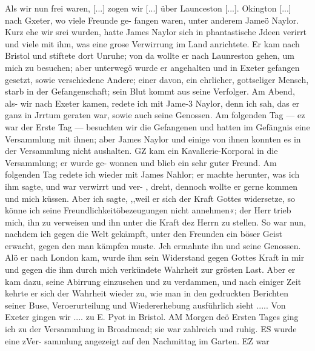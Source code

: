 Als wir nun frei waren, [...] zogen wir [...] über Launceston 
[...]. Okington [...] nach Gxeter, wo viele Freunde ge-
fangen waren, unter anderem Jameö Naylor. Kurz ehe wir
srei wurden, hatte James Naylor sich in phantastische Jdeen
verirrt und viele mit ihm, was eine grose Verwirrung im Land
anrichtete. Er kam nach Bristol und stiftete dort Unruhe; von
da wollte er nach Launreston gehen, um mich zu besuchen; aber
unterwegö wurde er angehalten und in Exeter gefangen gesetzt,
sowie verschiedene Andere; einer davon, ein ehrlicher, gottseliger
Mensch, starb in der Gefangenschaft; sein Blut kommt aus seine
Verfolger.
Am Abend, als- wir nach Exeter kamen, redete ich mit Jame-3
Naylor, denn ich sah, das er ganz in Jrrtum geraten war, sowie
auch seine Genossen. Am folgenden Tag — ez war der Erste
Tag — besuchten wir die Gefangenen und hatten im Gefängnis
eine Versammlung mit ihnen; aber James Naylor und einige
von ihnen konnten es in der Versammlung nicht aushalten. GZ
kam ein Kavallerie-Korporal in die Versammlung; er wurde ge-
wonnen und blieb ein sehr guter Freund.
Am folgenden Tag redete ich wieder mit James Nahlor; er
machte herunter, was ich ihm sagte, und war verwirrt und ver-
, dreht, dennoch wollte er gerne kommen und mich küssen. Aber
ich sagte, ,,weil er sich der Kraft Gottes widersetze, so könne ich
seine Freundlichkeitöbezeugungen nicht annehmen«; der Herr trieb
mich, ihn zu verweisen und ihn unter die Kraft dez Herrn zu
stellen. So war nun, nachdem ich gegen die Welt gekämpft, unter
den Freunden ein böser Geist erwacht, gegen den man kämpfen
muste. Jch ermahnte ihn und seine Genossen. Alö er nach
London kam, wurde ihm sein Widerstand gegen Gottes Kraft in
mir und gegen die ihm durch mich verkündete Wahrheit zur
grösten Last. Aber er kam dazu, seine Abirrung einzusehen und
zu verdammen, und nach einiger Zeit kehrte er sich der Wahrheit
wieder zu, wie man in den gedruckten Berichten seiner Buse,
Veroerurteilung und Wiedererhebung ausführlich sieht .....
Von Exeter gingen wir .... zu E. Pyot in Bristol. AM
Morgen deö Ersten Tages ging ich zu der Versammlung in
Broadmead; sie war zahlreich und ruhig. ES wurde eine zVer-
sammlung angezeigt auf den Nachmittag im Garten. EZ war


